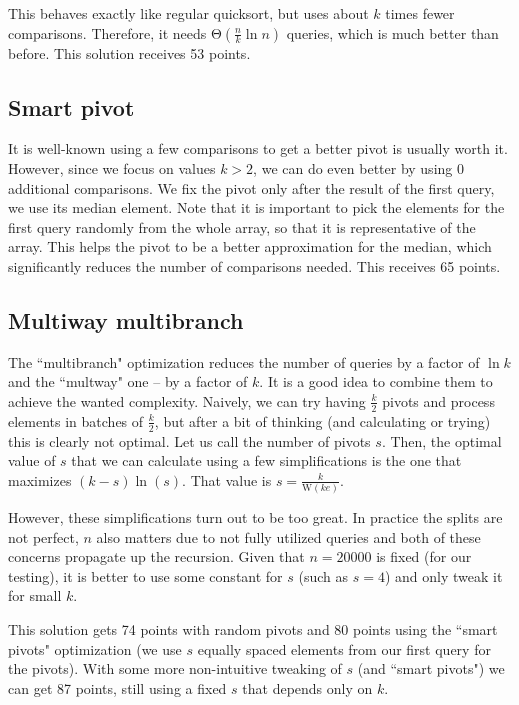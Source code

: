 \documentclass{article}
\begin{document}
This behaves exactly like regular quicksort, but uses about $ k $ times fewer comparisons. Therefore, it needs $ \mathrm{\Theta}\left( \frac{n}{k} \ln{n} \right) $ queries, which is much better than before. This solution receives 53 points.

\subsection{Smart pivot}

It is well-known using a few comparisons to get a better pivot is usually worth it. However, since we focus on values $ k > 2 $, we can do even better by using 0 additional comparisons. We fix the pivot only after the result of the first query, we use its median element. Note that it is important to pick the elements for the first query randomly from the whole array, so that it is representative of the array. This helps the pivot to be a better approximation for the median, which significantly reduces the number of comparisons needed. This receives 65 points.

\subsection{Multiway multibranch}

The ``multibranch" optimization reduces the number of queries by a factor of $ \ln{k} $ and the ``multway" one -- by a factor of $ k $. It is a good idea to combine them to achieve the wanted complexity. Naively, we can try having $ \frac{k}{2} $ pivots and process elements in batches of $ \frac{k}{2} $, but after a bit of thinking (and calculating or trying) this is clearly not optimal. Let us call the number of pivots $ s $. Then, the optimal value of $ s $ that we can calculate using a few simplifications is the one that maximizes $ (k - s) \ln{(s)} $. That value is $ s = \frac{k}{ \mathrm{W}(ke) } $.

However, these simplifications turn out to be too great. In practice the splits are not perfect, $ n $ also matters due to not fully utilized queries and both of these concerns propagate up the recursion. Given that $ n = 20000 $ is fixed (for our testing), it is better to use some constant for $ s $  (such as $ s = 4 $) and only tweak it for small $ k $.

This solution gets 74 points with random pivots and 80 points using the ``smart pivots" optimization (we use $ s $ equally spaced elements from our first query for the pivots). With some more non-intuitive tweaking of $ s $ (and ``smart pivots") we can get 87 points, still using a fixed $ s $ that depends only on $ k $.
\end{document}
